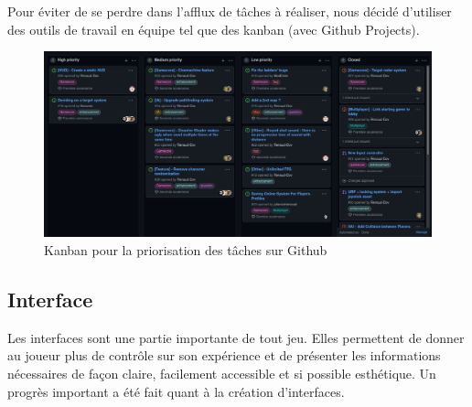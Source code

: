 \documentclass[french, 12pt]{article}
\begin{document}
    Pour éviter de se perdre dans l'afflux de tâches à réaliser, nous décidé d'utiliser des
    outils de travail en équipe tel que des kanban (avec Github Projects).\\
    

    \begin{figure}[hbt!]
        \centering
        \includegraphics[scale=0.28]{kanban.png}
        \caption{Kanban pour la priorisation des tâches sur Github}
    \end{figure}


    
    
    \newpage

    



    
    \newpage


    \subsection{Interface}
    
    Les interfaces sont une partie importante de tout jeu. Elles permettent de donner au joueur plus de contrôle sur son expérience et de présenter les informations nécessaires de façon claire, facilement accessible et si possible esthétique. Un progrès important a été fait quant à la création d'interfaces.
\end{document}
